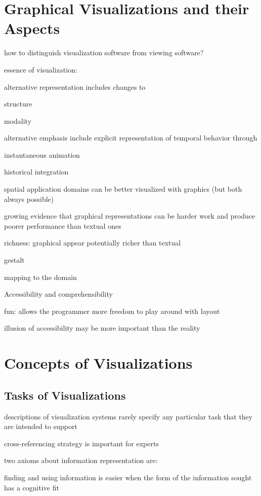 \documentclass[11pt, a4paper, ngerman, twoside]{article}
\theoremstyle{plain}\newtheorem{Lemma}{Lemma}
\theoremstyle{plain}\newtheorem{Satz}[Lemma]{Satz}
\theoremstyle{definition}\newtheorem{Definition}[Lemma]{Definition}
\theoremstyle{definition}\newtheorem*{Beispiel}{Beispiel}
\theoremstyle{remark}\newtheorem*{Bemerkung}{Bemerkung}
\begin{document}
\section{Graphical Visualizations and their Aspects}

how to distinguish visualization software from viewing software?

essence of visualization:

alternative representation includes changes to

structure

modality

alternative emphasis include explicit representation of temporal behavior through

instantaneous animation

historical integration

spatial application domains can be better visualized with graphics (but both always possible)

growing evidence that graphical representations can be harder work and produce poorer performance than textual ones 

richness: graphical appear potentially richer than textual

gestalt

mapping to the domain

Accessibility and comprehensibility

fun: allows the programmer more freedom to play around with layout

illusion of accessibility may be more important than the reality

\section{Concepts of Visualizations}

\subsection{Tasks of Visualizations}

descriptions of visualization systems rarely specify any particular task that they are intended to support

cross-referencing strategy is important for experts

two axioms about information representation are:

finding and using information is easier when the form of the information sought has a cognitive fit
\end{document}
